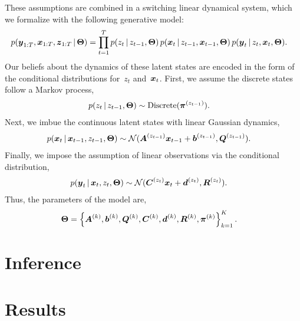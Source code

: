 \documentclass{article}
\begin{document}

These assumptions
are combined in a switching linear dynamical system, which we formalize 
with the following generative model:
\begin{align}
  p(\boldsymbol{y}_{1:T}, \boldsymbol{x}_{1:T}, \boldsymbol{z}_{1:T} \,|\, \boldsymbol{\Theta}) &= 
  \prod_{t=1}^T
  p(z_t \,|\, z_{t-1}, \boldsymbol{\Theta}) \, 
  p(\boldsymbol{x}_t \,|\, z_{t-1}, \boldsymbol{x}_{t-1}, \boldsymbol{\Theta}) \, 
  p(\boldsymbol{y}_t \,|\, z_t, \boldsymbol{x}_t, \boldsymbol{\Theta}).
\end{align}
Our beliefs about the dynamics of these latent states are encoded in the 
form of the conditional distributions for~$z_t$ and~$\boldsymbol{x}_t$. First,
we assume the discrete states follow a Markov process,
\begin{align}
  p(z_t \,|\, z_{t-1}, \boldsymbol{\Theta}) &\sim \mathrm{Discrete}(\boldsymbol{\pi}^{(z_{t-1})}).
\end{align}
Next, we imbue the continuous latent states with linear Gaussian dynamics,
\begin{align}
  p(\boldsymbol{x}_t \,|\, \boldsymbol{x}_{t-1}, z_{t-1}, \boldsymbol{\Theta}) 
  &\sim \mathcal{N}(\boldsymbol{A}^{(z_{t-1})} \boldsymbol{x}_{t-1} + \boldsymbol{b}^{(z_{t-1})}, \boldsymbol{Q}^{(z_{t-1})}).
\end{align}
Finally, we impose the assumption of linear observations via the conditional
distribution,
\begin{align}
  p(\boldsymbol{y}_t \,|\, \boldsymbol{x}_{t}, z_{t}, \boldsymbol{\Theta}) 
  &\sim \mathcal{N}(\boldsymbol{C}^{(z_{t})} \boldsymbol{x}_{t} + \boldsymbol{d}^{(z_{t})}, \boldsymbol{R}^{(z_t)}).
\end{align}
Thus, the parameters of the model are,
\begin{align}
  \boldsymbol{\Theta} &= \left\{ \boldsymbol{A}^{(k)}, \boldsymbol{b}^{(k)}, \boldsymbol{Q}^{(k)}, \boldsymbol{C}^{(k)}, \boldsymbol{d}^{(k)}, \boldsymbol{R}^{(k)}, \boldsymbol{\pi}^{(k)} \right\}_{k=1}^K .
\end{align}


\section{Inference}

\section{Results}



\end{document}

